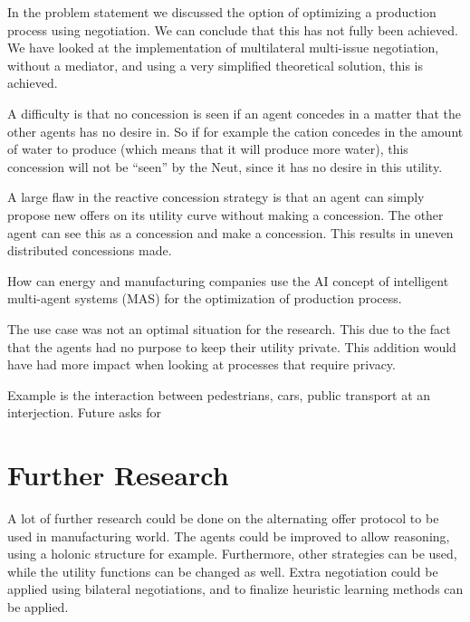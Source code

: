 In the problem statement we discussed the option of optimizing a production process using negotiation. We can conclude that this has not fully been achieved. We have looked at the implementation of multilateral multi-issue negotiation, without a mediator, and using a very simplified theoretical solution, this is achieved. 

A difficulty is that no concession is seen if an agent concedes in a matter that the other agents has no desire in. So if for example the cation concedes in the amount of water to produce (which means that it will produce more water), this concession will not be ``seen'' by the Neut, since it has no desire in this utility. %


A large flaw in the reactive concession strategy is that an agent can simply propose new offers on its utility curve without making a concession. The other agent can see this as a concession and make a concession. This results in uneven distributed concessions made. 


How can energy and manufacturing companies use the AI concept of intelligent multi-agent systems (MAS) for the optimization of production process.

The use case was not an optimal situation for the research. This due to the fact that the agents had no purpose to keep their utility private. This addition would have had more impact when looking at processes that require privacy.

Example is the interaction between pedestrians, cars, public transport at an interjection. Future asks for 

\section{Further Research}
A lot of further research could be done on the alternating offer protocol to be used in manufacturing world. The agents could be improved to allow reasoning, using a holonic structure for example. Furthermore, other strategies can be used, while the utility functions can be changed as well. Extra negotiation could be applied using bilateral negotiations, and to finalize heuristic learning methods can be applied.

